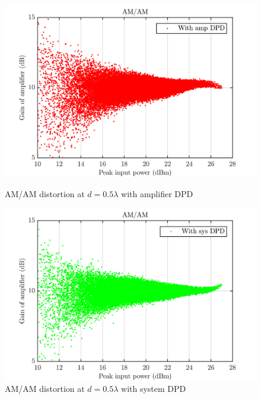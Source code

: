 \begin{figure}[H]
  \centering
  \begin{minipage}[b]{0.5\textwidth}
	\includegraphics[scale = 0.5]{figures/measurement/cree/meas3/amam_amp_dpd_0p5.png}
	\caption{AM/AM distortion at $d = 0.5\lambda$ with amplifier DPD}	
    \label{fig:meas3_amam5_2}
  \end{minipage}
  \hfill
  \begin{minipage}[b]{0.4\textwidth}
	\includegraphics[scale = 0.5]{figures/measurement/cree/meas3/amam_sys_dpd_0p5.png}
	\caption{AM/AM distortion at $d = 0.5\lambda$ with system DPD}
    \label{fig:meas3_amam6_2}
  \end{minipage}
\end{figure}

